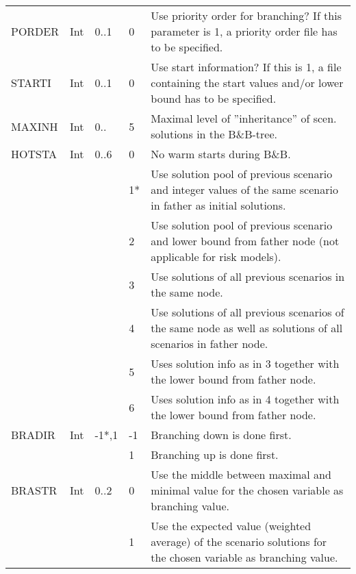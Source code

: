 \documentclass[11pt,draft]{article}
\newcommand{\+}{{\ti{+}}}
\newcommand{\1}{{\ti{1}}}
\begin{document}
\newpage
\begin{center}
\tablelasttail{\hline}
\begin{supertabular}{|llllp{6.2cm}|} 
PORDER&Int&0..1&0&Use priority order for branching? If this
parameter is 1, a priority order file has to be specified. \\[0.2em]
STARTI&Int&0..1&0&Use start information? If this is 1, a file
  containing the start values and/or lower bound has to be specified.\\[0.2em]
MAXINH&Int&0..&5&Maximal level of ''inheritance'' of scen. solutions in the B\&B-tree.\\[0.2em]
HOTSTA&Int&0..6&0&No warm starts during B\&B.\\
&&&1*&Use solution pool of previous scenario and integer values of the same scenario in father as initial solutions.\\
&&&2&Use solution pool of previous scenario and lower bound from father node (not applicable for risk models).\\
&&&3&Use solutions of all previous scenarios in the same node.\\ 
&&&4&Use solutions of all previous scenarios of the same node as well as solutions of all scenarios in father node.\\ 
&&&5&Uses solution info as in 3 together with the lower bound from father node.\\ 
&&&6&Uses solution info as in 4 together with the lower bound from father node.\\[0.2em]
BRADIR&Int&-1*,1&-1&Branching down is done first.\\
&&&1&Branching up is done first. \\[0.2em]
BRASTR&Int&0..2&0&Use the middle between maximal and minimal value for the chosen variable as branching value.\\
&&&1&Use the expected value (weighted average) of the scenario solutions for the chosen variable as branching value.\\

\end{supertabular}
\end{center}
\end{document}
